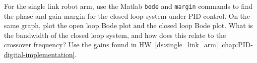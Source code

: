 
For the single link robot arm, use the Matlab \texttt{bode} and \texttt{margin} commands to find the phase and gain margin for the closed loop system under PID control.  On the same graph, plot the open loop Bode plot and the closed loop Bode plot.  What is the bandwidth of the closed loop system, and how does this relate to the crossover frequency?  Use the gains found in HW~\ref{ds:single_link_arm}.\ref{chap:PID-digital-implementation}.
